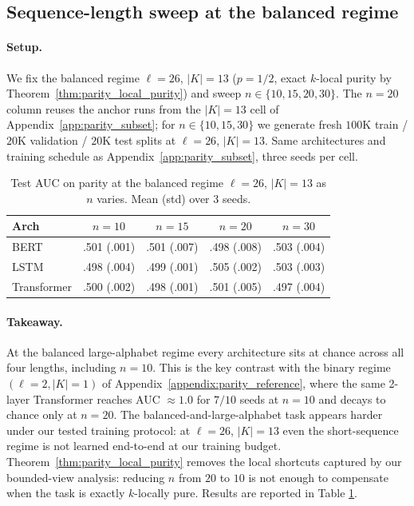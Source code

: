 \documentclass{article}
\theoremstyle{plain}
\theoremstyle{definition}
\theoremstyle{remark}
\begin{document}
\subsection{Sequence-length sweep at the balanced regime}
\label{app:parity_length}

\paragraph{Setup.} We fix the balanced regime $\ell = 26$, $|K| = 13$ ($p = 1/2$, exact $k$-local purity by Theorem~\ref{thm:parity_local_purity}) and sweep $n \in \{10, 15, 20, 30\}$. The $n = 20$ column reuses the anchor runs from the $|K| = 13$ cell of Appendix~\ref{app:parity_subset}; for $n \in \{10, 15, 30\}$ we generate fresh $100\text{K}$ train / $20\text{K}$ validation / $20\text{K}$ test splits at $\ell = 26$, $|K| = 13$. Same architectures and training schedule as Appendix~\ref{app:parity_subset}, three seeds per cell.

\begin{table}[h]
\centering
\caption{Test AUC on parity at the balanced regime $\ell = 26$, $|K| = 13$ as $n$ varies. Mean (std) over 3 seeds.}
\label{tab:parity_length}
\begin{tabular}{@{}lcccc@{}}
\toprule
Arch & $n{=}10$ & $n{=}15$ & $n{=}20$ & $n{=}30$ \\
\midrule
BERT        & .501 (.001) & .501 (.007) & .498 (.008) & .503 (.004) \\
LSTM        & .498 (.004) & .499 (.001) & .505 (.002) & .503 (.003) \\
Transformer & .500 (.002) & .498 (.001) & .501 (.005) & .497 (.004) \\
\bottomrule
\end{tabular}
\end{table}

\paragraph{Takeaway.} At the balanced large-alphabet regime every architecture sits at chance across all four lengths, including $n = 10$. This is the key contrast with the binary regime $(\ell = 2, |K| = 1)$ of Appendix~\ref{appendix:parity_reference}, where the same 2-layer Transformer reaches AUC $\approx 1.0$ for $7/10$ seeds at $n = 10$ and decays to chance only at $n = 20$. The balanced-and-large-alphabet task appears harder under our tested training protocol: at $\ell = 26$, $|K| = 13$ even the short-sequence regime is not learned end-to-end at our training budget. Theorem~\ref{thm:parity_local_purity} removes the local shortcuts captured by our bounded-view analysis: reducing $n$ from $20$ to $10$ is not enough to compensate when the task is exactly $k$-locally pure. Results are reported in Table \ref{tab:parity_length}.
\end{document}
